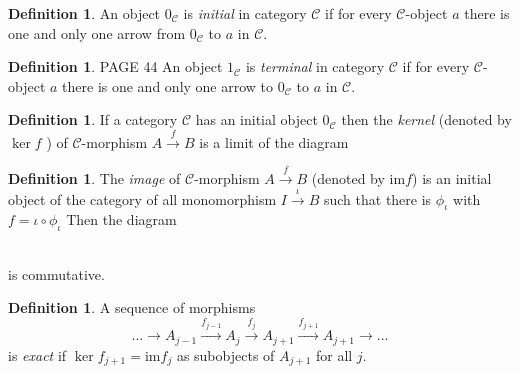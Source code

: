 \documentclass[10]{article}
\theoremstyle{plain}
\theoremstyle{definition}
\theoremstyle{definition}
\newtheorem{definition}[prop]{Definition}
\numberwithin{equation}{section}
\newcommand{\7}{\dagger}                     %
\newcommand{\8}{\bullet}                     %
\renewcommand{\.}{\cdot}                     %
\renewcommand{\:}{\colon}                    %
\renewcommand{\:}{\colon}           %
\newcommand{\im}{\mathrm{im}}       %
\begin{document}
\begin{appendices}
\begin{definition}
				An object $0_{\mathscr C}$ is \textit{initial} in category $\mathscr C$ if for every $\mathscr C$-object $a$ 
				there is one and only one arrow from $0_{\mathscr C}$ to $a$ in ${\mathscr C}$. 
			\end{definition}
			
			\begin{definition}\label{terminal_ob_defn}\cite{goldblatt:topoi}
				PAGE 44
				An object $1_{\mathscr C}$ is \textit{terminal} in category $\mathscr C$ if for every $\mathscr C$-object $a$ 
				there is one and only one arrow to $0_{\mathscr C}$ to $a$ in ${\mathscr C}$. 
			\end{definition}
			
			\begin{definition}\label{kernel_defn}
				\cite{faith_rmcat}
				If a category $\mathscr C$ has an initial object $0_{\mathscr C}$ then the \textit{kernel} (denoted by $\ker f$ ) of  ${\mathscr C}$-morphism $A \xrightarrow{f} B$ is a limit of the diagram
				\newline
				
			\end{definition}
			\begin{definition}\label{image_defn}\cite{faith_rmcat}
				The \textit{image} of ${\mathscr C}$-morphism $A \xrightarrow{f} B$ (denoted by $\im f$) is an initial object of the category of all monomorphism $I \xrightarrow{\iota} B$ such that there is $\phi_\iota$ with $f = \iota \circ \phi_\iota$ Then the diagram
				\newline
				\\
				is commutative. %
			\end{definition}
			\begin{definition}\label{exact_sec_defn}\cite{faith_rmcat}
				A sequence of morphisms 
				$$
				...\to A_{j-1}\xrightarrow{f_{j-1}} A_{j}\xrightarrow{f_{j}} A_{j+1}\xrightarrow{f_{j+1}} A_{j+1}\to ...
				$$
				is \textit{exact} if $\ker f_{j+1}= \im f_j$ as subobjects of $A_{j+1}$ for all $j$.
			\end{definition}
			

\end{appendices}
\end{document}
